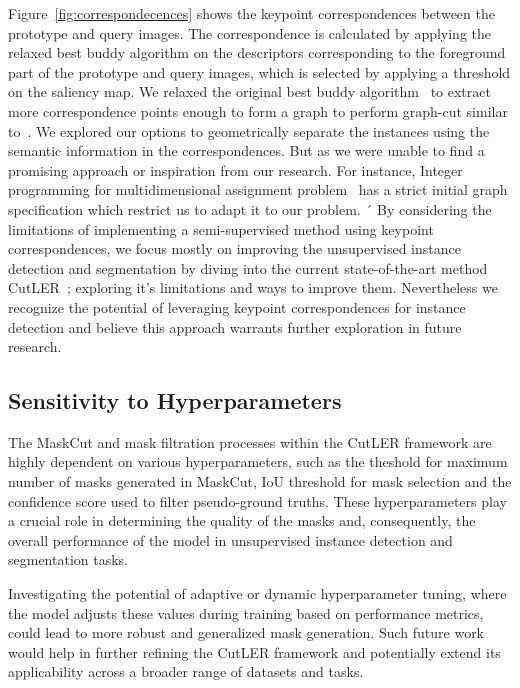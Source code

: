 Figure~\ref{fig:correspondecences} shows the keypoint correspondences between the prototype and query images. The correspondence is calculated by applying the relaxed best buddy algorithm on the descriptors corresponding to the foreground part of the prototype and query images, which is selected by applying a threshold on the saliency map. We relaxed the original best buddy algorithm~\cite{Aberman_2018} to extract more correspondence points enough to form a graph to perform graph-cut similar to~\cite{wang2022tokencut, sarlin2020supergluelearningfeaturematching}. We explored our options to geometrically separate the instances using the semantic information in the correspondences. But as we were unable to find a promising approach or inspiration from our research. For instance, Integer programming for multidimensional assignment problem~\cite{WALTEROS2014553} has a strict initial graph specification which restrict us to adapt it to our problem.
´
By considering the limitations of implementing a semi-supervised method using keypoint correspondences, we focus mostly on improving the unsupervised instance detection and segmentation by diving into the current state-of-the-art method CutLER~\cite{wang2023cut}; exploring it's limitations and ways to improve them. Nevertheless we recognize the potential of leveraging keypoint correspondences for instance detection and believe this approach warrants further exploration in future research.

\subsection{Sensitivity to Hyperparameters}
The MaskCut and mask filtration processes within the CutLER framework are highly dependent on various hyperparameters, such as the theshold for maximum number of masks generated in MaskCut, IoU threshold for mask selection and the confidence score used to filter pseudo-ground truths. These hyperparameters play a crucial role in determining the quality of the masks and, consequently, the overall performance of the model in unsupervised instance detection and segmentation tasks.

Investigating the potential of adaptive or dynamic hyperparameter tuning, where the model adjusts these values during training based on performance metrics, could lead to more robust and generalized mask generation. Such future work would help in further refining the CutLER framework and potentially extend its applicability across a broader range of datasets and tasks.

